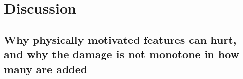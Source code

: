 
\section{Discussion}
\label{sec:discussion}

\subsection{Why physically motivated features can hurt, and why the damage is not
monotone in how many are added}
\label{sec:disc-mechanism}


